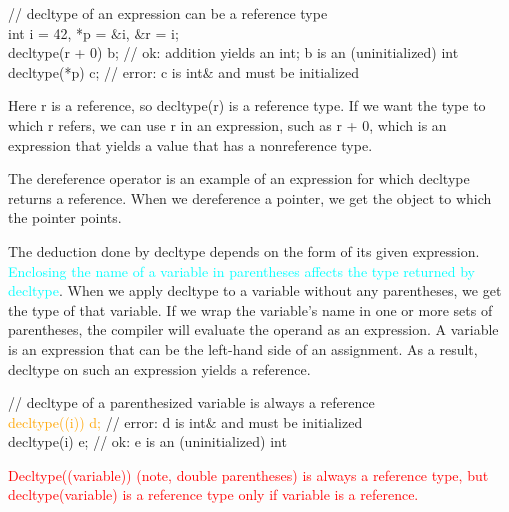 \documentclass[12pt,a4paper]{article}
\begin{document}
// decltype of an expression can be a reference type \\
int i = 42, *p = $\&$i, $\&$r = i; \\
decltype(r + 0) b; // ok: addition yields an int; b is an (uninitialized) int \\
decltype(*p) c; // error: c is int$\&$ and must be initialized

Here r is a reference, so decltype(r) is a reference type. If we want the type to which r refers, we can use r in an expression, such as r + 0, which is an expression that yields a value that has a nonreference type.

The dereference operator is an example of an expression for which decltype returns a reference. When we dereference a pointer, we get the object to which the pointer points. 

The deduction done by decltype depends on the form of its given expression. \textcolor{cyan}{Enclosing the name of a variable in parentheses affects the type returned by decltype}. When we apply decltype to a variable without any parentheses, we get the type of that variable. If we wrap the variable’s name in one or more sets of parentheses, the compiler will evaluate the operand as an expression. A variable is an expression that can be the left-hand side of an assignment. As a result, decltype on such an expression yields a reference.

// decltype of a parenthesized variable is always a reference \\
\textcolor{orange}{decltype((i)) d;} // error: d is int$\&$ and must be initialized \\
decltype(i) e; // ok: e is an (uninitialized) int

\textcolor{red}{Decltype((variable)) (note, double parentheses) is always a reference type, but decltype(variable) is a reference type only if variable is a reference.}
\end{document}
